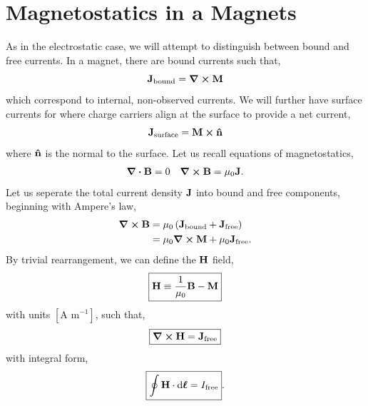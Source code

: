 \documentclass{book}
\begin{document}
\section{Magnetostatics in a Magnets}
As in the electrostatic case, we will attempt to distinguish between bound and free currents. In a magnet, there are bound currents such that,
\begin{equation}
	\vb{J}_{\text{bound}} = \curl{\vb{M}}
\end{equation}
which correspond to internal, non-observed currents. We will further have surface currents for where charge carriers align at the surface to provide a net current,
\begin{equation}
	\vb{J}_{\text{surface}} = \vb{M} \cross \vu{n}
\end{equation}
where $\vu{n}$ is the normal to the surface. Let us recall equations of magnetostatics,
\begin{align*}
	\div{\vb{B}} = 0 && \curl{\vb{B}} = \mu_0 \vb{J}.
\end{align*}
Let us seperate the total current density $\vb{J}$ into bound and free components, beginning with Ampere's law,
\begin{equation}
	\begin{split}
		\curl{\vb{B}} & = \mu_0\left(\vb{J}_{\text{bound}} + \vb{J}_{\text{free}}\right) \\
		& = \mu_0\curl{\vb{M}} + \mu_0\vb{J}_{\text{free}}.
	\end{split}
\end{equation}
By trivial rearrangement, we can define the $\vb{H}$ field,
\begin{equation}
	\boxed{\vb{H} \equiv \frac{1}{\mu_0}\vb{B} - \vb{M}}
\end{equation}
with units $\left[\text{A m}^{-1}\right]$, such that,
\begin{equation}
	\boxed{\curl{\vb{H}} = \vb{J}_{\text{free}}}
\end{equation}
with integral form,
\begin{equation}
	\boxed{\oint\vb{H} \cdot \dd{\vb*{\ell}} = I_{\text{free}}}.
\end{equation}
\end{document}
